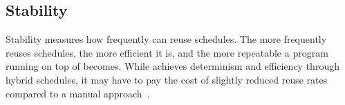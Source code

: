 

\subsection{Stability} \label{sec:stable}

Stability measures how frequently \peregrine can reuse schedules.  The more
frequently \peregrine reuses schedules, the more efficient it is, and the
more repeatable a program running on top of \peregrine becomes.  While \peregrine
achieves determinism and efficiency through hybrid schedules, it may have
to pay the cost of slightly reduced reuse rates compared to a
manual approach~\cite{cui:tern:osdi10}.




